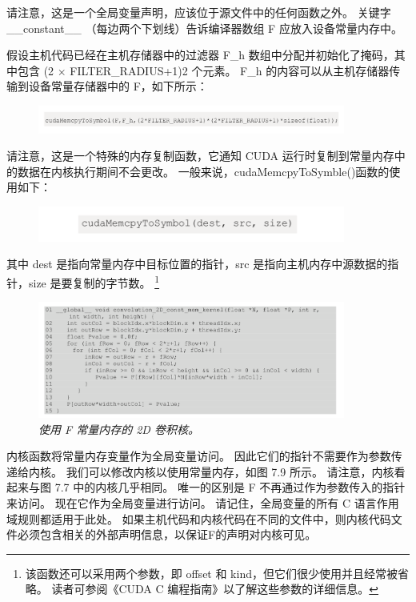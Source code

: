 请注意，这是一个全局变量声明，应该位于源文件中的任何函数之外。 
关键字 \_\_constant\_\_ （每边两个下划线）告诉编译器数组 F 应放入设备常量内存中。

假设主机代码已经在主机存储器中的过滤器 F\_h 数组中分配并初始化了掩码，其中包含 (2 $\times$ FILTER\_RADIUS+1)2 个元素。 
F\_h 的内容可以从主机存储器传输到设备常量存储器中的 F，如下所示：

\begin{figure}[H]
	\centering
	\includegraphics[width=0.9\textwidth]{figs/F7-a4.png}
\end{figure}

请注意，这是一个特殊的内存复制函数，它通知 CUDA 运行时复制到常量内存中的数据在内核执行期间不会更改。 
一般来说，cudaMemcpyToSymble()函数的使用如下：

\begin{figure}[H]
	\centering
	\includegraphics[width=0.9\textwidth]{figs/F7-a5.png}
\end{figure}

其中 dest 是指向常量内存中目标位置的指针，src 是指向主机内存中源数据的指针，size 是要复制的字节数。
\footnote{该函数还可以采用两个参数，即 offset 和 kind，但它们很少使用并且经常被省略。 
读者可参阅《CUDA C 编程指南》以了解这些参数的详细信息。}

\begin{figure}[H]
	\centering
	\includegraphics[width=0.9\textwidth]{figs/F7.9.png}
	\caption{\textit{使用 F 常量内存的 2D 卷积核。}}
\end{figure}

内核函数将常量内存变量作为全局变量访问。 因此它们的指针不需要作为参数传递给内核。 
我们可以修改内核以使用常量内存，如图 7.9 所示。 请注意，内核看起来与图 7.7 中的内核几乎相同。 
唯一的区别是 F 不再通过作为参数传入的指针来访问。 现在它作为全局变量进行访问。 
请记住，全局变量的所有 C 语言作用域规则都适用于此处。 
如果主机代码和内核代码在不同的文件中，则内核代码文件必须包含相关的外部声明信息，以保证F的声明对内核可见。

